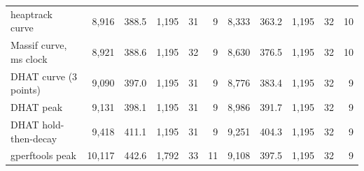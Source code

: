 \begin{tabular}{lrrrrrrrrrr}
heaptrack curve & 8{,}916 & 388.5 & 1{,}195 & 31 & 9 & 8{,}333 & 363.2 & 1{,}195 & 32 & 10 \\
Massif curve, ms clock & 8{,}921 & 388.6 & 1{,}195 & 32 & 9 & 8{,}630 & 376.5 & 1{,}195 & 32 & 10 \\
DHAT curve (3 points) & 9{,}090 & 397.0 & 1{,}195 & 31 & 9 & 8{,}776 & 383.4 & 1{,}195 & 32 & 9 \\
DHAT peak & 9{,}131 & 398.1 & 1{,}195 & 31 & 9 & 8{,}986 & 391.7 & 1{,}195 & 32 & 9 \\
DHAT hold-then-decay & 9{,}418 & 411.1 & 1{,}195 & 31 & 9 & 9{,}251 & 404.3 & 1{,}195 & 32 & 9 \\
gperftools peak & 10{,}117 & 442.6 & 1{,}792 & 33 & 11 & 9{,}108 & 397.5 & 1{,}195 & 32 & 9 \\
\bottomrule
\end{tabular}
